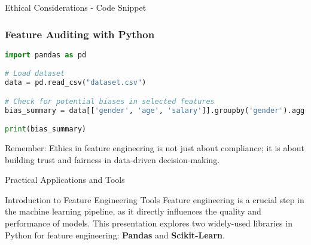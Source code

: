\documentclass[aspectratio=169]{beamer}
\begin{document}
\begin{frame}[fragile]{Ethical Considerations - Code Snippet}
    \frametitle{Feature Auditing with Python}
    \begin{lstlisting}[language=Python]
import pandas as pd

# Load dataset
data = pd.read_csv("dataset.csv")

# Check for potential biases in selected features
bias_summary = data[['gender', 'age', 'salary']].groupby('gender').agg(['mean', 'count'])

print(bias_summary)
    \end{lstlisting}
    \begin{block}{Remember:}
        Ethics in feature engineering is not just about compliance; it is about building trust and fairness in data-driven decision-making.
    \end{block}
\end{frame}

\begin{frame}[fragile]{Practical Applications and Tools}
    \begin{block}{Introduction to Feature Engineering Tools}
        Feature engineering is a crucial step in the machine learning pipeline, as it directly influences the quality and performance of models. This presentation explores two widely-used libraries in Python for feature engineering: \textbf{Pandas} and \textbf{Scikit-Learn}.
    \end{block}
\end{frame}
\end{document}
